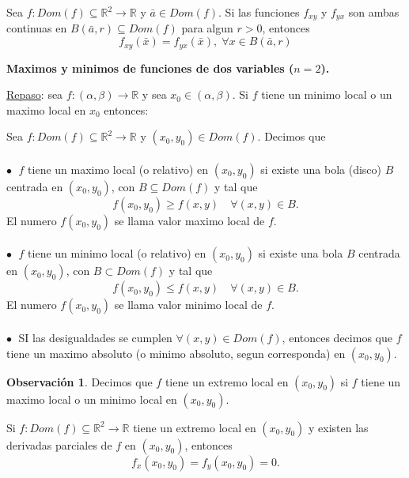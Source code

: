 \documentclass{article}
\theoremstyle{definition}
\theoremstyle{definition}
\newtheorem*{obs}{Observación}
\theoremstyle{remark}
\newcommand\bl{$\bullet\;$}
\begin{document}
\begin{teo}
  Sea $f : Dom(f) \subseteq \mathbb{R}^2 \to \mathbb{R}$ y $\bar{a} \in Dom(f)$. Si las funciones $f_{xy}$ y $f_{yx}$ son ambas continuas en $B(\bar{a},r)  \subseteq Dom(f)$ para algun $r>0$, entonces \[
    f_{xy}(\bar{x})=f_{yx}(\bar{x}), \; \forall x \in B(\bar{a},r)
  \]
\end{teo}
\begin{center}
\textbf{Maximos y minimos de funciones de dos variables ($n=2$).}
\end{center}
\underline{Repaso}: sea $f : (\alpha, \beta) \to \mathbb{R}$ y sea $x_0 \in (\alpha,\beta)$. Si $f$ tiene un minimo local o un maximo local en $x_0$ entonces: 
  \begin{figure}[h]
\centering
\def\svgwidth{1\textwidth}
\makebox[\textwidth]{
}
\end{figure} \; \pagebreak
\begin{defi}
  Sea $f : Dom(f) \subseteq \mathbb{R}^2 \to \mathbb{R}$ y $(x_0,y_0) \in Dom(f)$. Decimos que \\\\
  \textcolor{rojop2}{\bl} $f$ tiene un maximo local (o relativo) en $(x_0,y_0)$ si existe una bola (disco) $B$ centrada en $(x_0,y_0)$, con $B \subseteq Dom(f)$ y tal que  $$f(x_0,y_0) \geq f(x,y) \quad \forall (x,y) \in B.$$ El numero $f(x_0,y_0)$ se llama valor maximo local de $f$. \\\\
  \textcolor{rojop2}{\bl} $f$ tiene un minimo local (o relativo) en $(x_0,y_0)$ si existe una bola $B$ centrada en $(x_0,y_0)$, con $B \subset Dom(f)$ y tal que \[
  f(x_0,y_0) \leq f(x,y) \quad \forall (x,y) \in B.
  \]
  El numero $f(x_0,y_0)$ se llama valor minimo local de $f$.\\\\
  \textcolor{rojop2}{\bl} SI las desigualdades se cumplen $\forall (x,y) \in Dom(f)$, entonces decimos que $f$ tiene un maximo absoluto (o minimo absoluto, segun corresponda) en $(x_0,y_0)$.
\end{defi}
\begin{obs}
  Decimos que $f$ tiene un extremo local en $(x_0,y_0)$ si $f$ tiene un maximo local o un minimo local en $(x_0,y_0)$.
\end{obs}
\begin{teo}
  Si $f : Dom(f) \subseteq \mathbb{R}^2 \to \mathbb{R}$ tiene un extremo local en $(x_0,y_0)$ y existen las derivadas parciales de $f$ en $(x_0,y_0)$, entonces $$f_x(x_0,y_0)=f_y(x_0,y_0)=0.$$
\end{teo}
\end{document}
